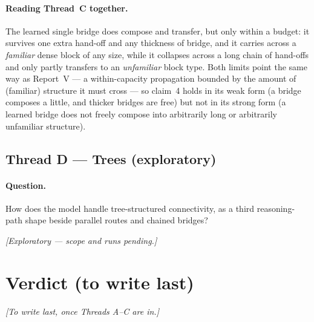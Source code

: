 \documentclass[11pt,a4paper]{article}
\begin{document}
\paragraph{Reading Thread~C together.} The learned single bridge does compose and transfer, but only
within a budget: it survives one extra hand-off and any thickness of bridge, and it carries across a
\emph{familiar} dense block of any size, while it collapses across a long chain of hand-offs and only
partly transfers to an \emph{unfamiliar} block type. Both limits point the same way as Report~V --- a
within-capacity propagation bounded by the amount of (familiar) structure it must cross --- so claim~4
holds in its weak form (a bridge composes a little, and thicker bridges are free) but not in its strong
form (a learned bridge does not freely compose into arbitrarily long or arbitrarily unfamiliar
structure).

\subsection{Thread D --- Trees (exploratory)}
\label{sec:res-trees}
\paragraph{Question.} How does the model handle tree-structured connectivity, as a third
reasoning-path shape beside parallel routes and chained bridges?

\emph{[Exploratory --- scope and runs pending.]}

\section{Verdict (to write last)}
\label{sec:verdict}
\emph{[To write last, once Threads A--C are in.]}
\end{document}

